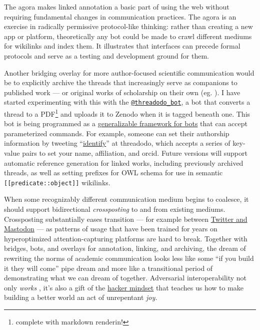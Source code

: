 The agora makes linked annotation a basic part of using the web without
requiring fundamental changes in communication practices. The agora is
an exercise in radically permissive protocol-like thinking: rather than
creating a new app or platform, theoretically any bot could be made to
crawl different mediums for wikilinks and index them. It illustrates
that interfaces can precede formal protocols and serve as a testing and
development ground for them.

Another bridging overlay for more author-focused scientific
communication would be to explicitly archive the threads that
increasingly serve as companions to published work --- or original works
of scholarship on their own (eg. \citep{bostonNeedKnowInformationSeeking2022} ). I have started experimenting
with this with the
\href{https://twitter.com/threadodo_bot}{\texttt{@threadodo\_bot}}, a
bot that converts a thread to a PDF\footnote{complete with markdown
  renderin!} and uploads it to Zenodo when it is tagged beneath one.
This bot is being programmed as a
\href{https://github.com/sneakers-the-rat/threadodo/blob/58d5f13f88728babdf2da0b34310c88349725566/threadodo/actions/commands.py\#L145-L168}{generalizable
framework for bots} that can accept parameterized commands. For example,
someone can set their authorship information by tweeting
``\href{https://twitter.com/json_dirs/status/1542305909983936512}{identify}''
at threadodo, which accepts a series of key-value pairs to set your
name, affiliation, and orcid. Future versions will support automatic
reference generation for linked works, including previously archived
threads, as well as setting prefixes for OWL schema for use in semantic
\texttt{{[}{[}predicate::object{]}{]}} wikilinks.

When some recognizably different communication medium begins to
coalesce, it should support bidirectional \emph{crossposting} to and
from existing mediums. Crossposting substantially eases transition ---
for example between
\href{https://crossposter.masto.donte.com.br/}{Twitter and Mastodon} ---
as patterns of usage that have been trained for years on hyperoptimized
attention-capturing platforms are hard to break. Together with bridges,
bots, and overlays for annotation, linking, and archiving, the dream of
rewriting the norms of academic communication looks less like some ``if
you build it they will come'' pipe dream and more like a transitional
period of demonstrating what we can dream of together. Adversarial
interoperability not only \emph{works} \citep{doctorowAdversarialInteroperability2019} , it's also a gift of the
\href{https://www.gwern.net/Unseeing}{hacker mindset} that teaches us
how to make building a better world an act of unrepentant \emph{joy.}

